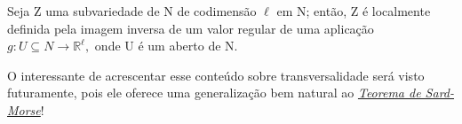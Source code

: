 \documentclass[../differential_topology.tex]{subfiles}
\begin{document}
\begin{tcolorbox}[
		skin=enhanced,
		title=Observação,
		fonttitle=\bfseries,
		colframe=black,
		colbacktitle=cyan!75!white,
		colback=cyan!15,
		colbacklower=black,
		coltitle=black,
		drop fuzzy shadow,
	]
	Seja Z uma subvariedade de N de codimensão \(\ell \) em N; então, Z é localmente definida pela imagem inversa de um valor regular de uma aplicação \(g:U\subseteq N\rightarrow \mathbb{R}^{\ell },\) onde U é um aberto de N.
\end{tcolorbox}
O interessante de acrescentar esse conteúdo sobre transversalidade será visto futuramente, pois ele oferece uma generalização bem natural ao \hyperlink{sard_theorem}{\textit{Teorema de Sard-Morse}}!
\end{document}
